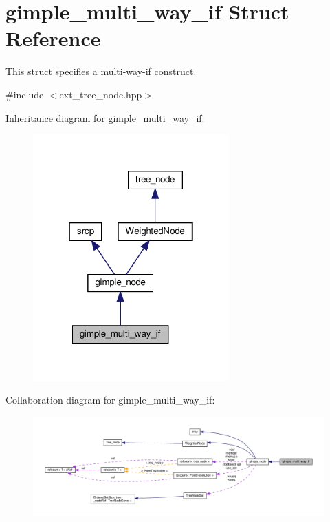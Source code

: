 \hypertarget{structgimple__multi__way__if}{}\section{gimple\+\_\+multi\+\_\+way\+\_\+if Struct Reference}
\label{structgimple__multi__way__if}


This struct specifies a multi-\/way-\/if construct.  




{\ttfamily \#include $<$ext\+\_\+tree\+\_\+node.\+hpp$>$}



Inheritance diagram for gimple\+\_\+multi\+\_\+way\+\_\+if\+:
\nopagebreak
\begin{figure}[H]
\begin{center}
\leavevmode
\includegraphics[width=214pt]{db/dbc/structgimple__multi__way__if__inherit__graph}
\end{center}
\end{figure}


Collaboration diagram for gimple\+\_\+multi\+\_\+way\+\_\+if\+:
\nopagebreak
\begin{figure}[H]
\begin{center}
\leavevmode
\includegraphics[width=350pt]{dc/d5d/structgimple__multi__way__if__coll__graph}
\end{center}
\end{figure}
